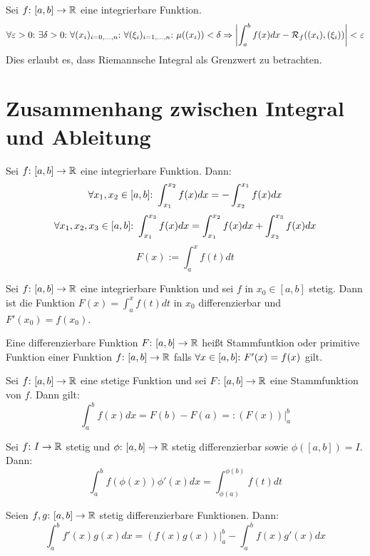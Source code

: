 \begin{framedthm}
	Sei $f{:}\ [a,b] \to \mathbb{R}$ eine integrierbare Funktion.
	\[
	\forall \varepsilon > 0{:}\  \exists \delta > 0{:}\  \forall (x_i)_{i=0,...,n}{:}\  \forall (\xi_i)_{i=1,...,n}{:}\  \mu((x_i)) < \delta \Rightarrow \biggl|\int_a^b f(x) dx - \mathcal{R}_f((x_i), (\xi_i))\biggr| < \varepsilon
	\]
	Dies erlaubt es, dass Riemannsche Integral als Grenzwert zu betrachten.
\end{framedthm}


\section{Zusammenhang zwischen Integral und Ableitung}

\begin{framedthm}
	Sei $f{:}\ [a,b] \to \mathbb{R}$ eine integrierbare Funktion. Dann:
	\[
	\forall x_1,x_2 \in [a,b]{:}\  \int_{x_{1}}^{x_{2}} f(x) dx = - \int_{x_{2}}^{x_{1}} f(x)dx
	\]
	\[
	\forall x_1, x_2, x_3 \in [a,b]{:}\  \int_{x_{1}}^{x_{3}} f(x) dx = \int_{x_{1}}^{x_{2}} f(x) dx + \int_{x_{2}}^{x_{3}} f(x) dx
	\]
	\[
	F(x) := \int_a^x f(t) dt
	\]
\end{framedthm}

\begin{framedthm}
	Sei $f{:}\ [a,b] \to \mathbb{R}$ eine integrierbare Funktion und sei $f$ in $x_0 \in [a,b]$ stetig. Dann ist die Funktion $F(x) = \int_a^x f(t) dt$ in $x_0$ differenzierbar und $F'(x_0) = f(x_0)$.
\end{framedthm}

\begin{frameddefn}[Stammfunktion]
	Eine differenzierbare Funktion $F{:}\ [a,b] \to \mathbb{R}$ heißt Stammfuntkion oder primitive Funktion einer Funktion $f{:}\ [a,b] \to \mathbb{R}$ falls $\forall x\in [a,b]{:}\  F'(x) = f(x)$ gilt.
\end{frameddefn}

\begin{framedthm}
	Sei $f{:}\ [a,b] \to \mathbb{R}$ eine stetige Funktion und sei $F{:}\ [a,b] \to \mathbb{R}$ eine Stammfunktion von $f$. Dann gilt:
	\[
	\int_a^b f(x) dx = F(b) - F(a) =: (F(x)) \bigr|_a^b
	\]
\end{framedthm}

\begin{framedthm}
	Sei $f{:}\  I \to \mathbb{R}$ stetig und $\phi{:}\  [a,b] \to \mathbb{R}$ stetig differenzierbar sowie $\phi([a,b]) = I$. Dann:
	\[
	\int_a^b f(\phi(x)) \phi'(x) dx = \int_{\phi(a)}^{\phi(b)} f(t) dt
	\]
\end{framedthm}

\begin{framedthm}
	Seien $f,g{:}\  [a,b] \to \mathbb{R}$ stetig differenzierbare Funktionen. Dann:
	\[
	\int_a^b f'(x)g(x) dx = (f(x)g(x))\bigr|_a^b - \int_a^b f(x) g'(x) dx
	\]
\end{framedthm}